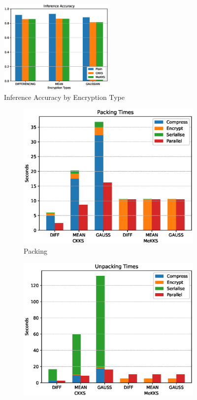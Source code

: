 \begin{figure}[h]
    \centering
    \includegraphics[width=0.5\textwidth]{figures/accuracy.eps}
    \caption{Inference Accuracy by Encryption Type}
    \label{fig:Inference Accuracy}
\end{figure}

\begin{figure}[h]
    \centering
    \begin{subfigure}[b]{0.45\textwidth}
        \centering
        \includegraphics[width=\textwidth]{figures/packingTimes.eps}
        \caption{Packing}
        \label{fig:Packing Times}
    \end{subfigure}
    \hfill
    \begin{subfigure}[b]{0.45\textwidth}
        \centering
        \includegraphics[width=\textwidth]{figures/unpackingTimes.eps}

\end{subfigure}
\end{figure}
